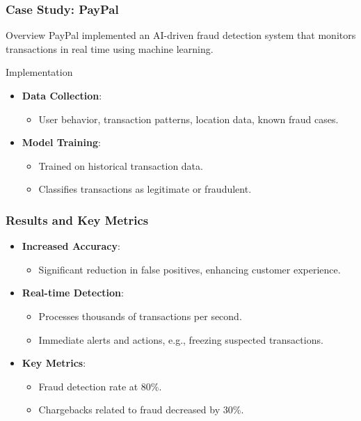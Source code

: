 \documentclass[aspectratio=169]{beamer}
\begin{document}
\begin{frame}[fragile]
    \frametitle{Case Study: PayPal}
    \begin{block}{Overview}
        PayPal implemented an AI-driven fraud detection system that monitors transactions in real time using machine learning.
    \end{block}

    \begin{block}{Implementation}
        \begin{itemize}
            \item \textbf{Data Collection}:
            \begin{itemize}
                \item User behavior, transaction patterns, location data, known fraud cases.
            \end{itemize}
            \item \textbf{Model Training}:
            \begin{itemize}
                \item Trained on historical transaction data.
                \item Classifies transactions as legitimate or fraudulent.
            \end{itemize}
        \end{itemize}
    \end{block}
\end{frame}

\begin{frame}[fragile]
    \frametitle{Results and Key Metrics}
    \begin{itemize}
        \item \textbf{Increased Accuracy}:
        \begin{itemize}
            \item Significant reduction in false positives, enhancing customer experience.
        \end{itemize}
        \item \textbf{Real-time Detection}:
        \begin{itemize}
            \item Processes thousands of transactions per second.
            \item Immediate alerts and actions, e.g., freezing suspected transactions.
        \end{itemize}
        \item \textbf{Key Metrics}:
        \begin{itemize}
            \item Fraud detection rate at 80\%.
            \item Chargebacks related to fraud decreased by 30\%.
        \end{itemize}
    \end{itemize}
\end{frame}
\end{document}
